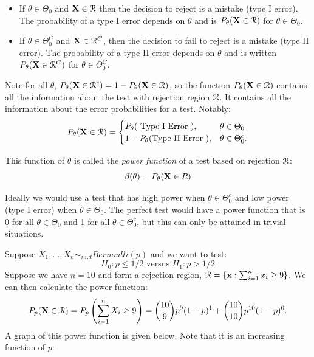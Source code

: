 \documentclass[11pt,]{article}
\providecommand{\tightlist}{%
  \setlength{\itemsep}{0pt}\setlength{\parskip}{0pt}}
\def\bx{{\bf x}}
\def\bX{{\bf X}}
\def\Rsc{{\cal R}}
\def\sumin{\sum_{i=1}^n}
\begin{document}
\begin{itemize}
\tightlist
\item
  If \(\theta \in \Theta_0\) and \(\bX \in \Rsc\) then the decision to
  reject is a mistake (type I error). The probability of a type I error
  depends on \(\theta\) and is \(P_\theta (\bX \in \Rsc)\) for
  \(\theta \in \Theta_0\).
\item
  If \(\theta \in \Theta_0^C\) and \(\bX \in \Rsc^C\), then the decision
  to fail to reject is a mistake (type II error). The probability of a
  type II error depends on \(\theta\) and is written
  \(P_\theta(\bX \in \Rsc^C)\) for \(\theta \in \Theta_0^C\).
\end{itemize}

Note for all \(\theta\),
\(P_\theta(\bX \in \Rsc^c) = 1 - P_\theta(\bX \in \Rsc)\), so the
function \(P_\theta(\bX \in \Rsc)\) contains all the information about
the test with rejection region \(\Rsc\). It contains all the information
about the error probabilities for a test. Notably: \[
P_\theta(\bX \in \Rsc) = 
\begin{cases}
P_\theta (\mbox{ Type I Error } ), & \theta \in \Theta_0\\
1 - P_\theta( \mbox {Type II Error }), & \theta \in \Theta_0^c.
\end{cases}
\]

 This function of \(\theta\) is called
the \emph{power function} of a test based on rejection \(\Rsc\):
\[\beta(\theta) = P_\theta(\bX \in R)\]

Ideally we would use a test that has high power when
\(\theta \in \Theta_0^c\) and low power (type I error) when
\(\theta \in \Theta_0\). The perfect test would have a power function
that is 0 for all \(\theta \in \Theta_0\) and 1 for all
\(\theta \in \Theta_0^c\), but this can only be attained in trivial
situations.

 Suppose
\(X_1, \ldots, X_n \sim_ {i.i.d} Bernoulli(p)\) and we want to test:
\[H_0: p\leq 1/2 \mbox{ versus } H_1: p > 1/2\] Suppose we have \(n=10\)
and form a rejection region, \(\Rsc = \{\bx: \sumin x_i \geq 9\}\). We
can then calculate the power function:
\[P_p(\bX \in \Rsc) = P_p\left(\sumin X_i \geq 9\right) = {10 \choose 9}p^9(1-p)^1 + {10 \choose 10}p^{10}(1-p)^0.\]
A graph of this power function is given below. Note that it is an
increasing function of \(p\):
\end{document}
